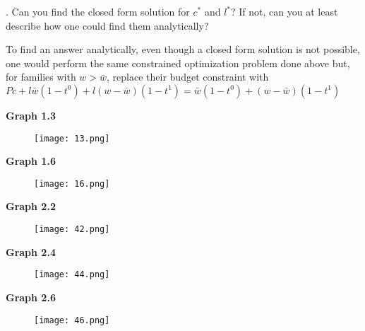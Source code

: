 \documentclass[11pt]{SelfArxOneColBMN}
\begin{document}
. Can you find the closed form solution for $c^*$ and $l^*$? If not, can you at least describe how one could find them analytically?
	\begin{solution}
		To find an answer analytically, even though a closed form solution is not possible, one would perform the same constrained optimization problem done above but, for families with $w > \bar{w}$, replace their budget constraint with\\
		$Pc + l\bar{w}(1 - t^0) + l(w - \bar{w})(1 - t^1) = \bar{w}(1 - t^0) + (w - \bar{w})(1 - t^1)$
	\end{solution}
\newpage
\clearpage
\noindent \textbf{Graph 1.3}
\begin{figure}[h]
        \texttt{[image: 13.png]}
\end{figure}
\clearpage
\noindent \textbf{Graph 1.6}
\begin{figure}[h]
        \texttt{[image: 16.png]}
\end{figure}
\newpage
\clearpage
\noindent \textbf{Graph 2.2}
\begin{figure}[h]
        \texttt{[image: 42.png]}
\end{figure}
\clearpage
\noindent \textbf{Graph 2.4}
\begin{figure}[h]
        \texttt{[image: 44.png]}
\end{figure}
\newpage
\clearpage
\noindent \textbf{Graph 2.6}
\begin{figure}[h]
        \texttt{[image: 46.png]}
\end{figure}
\end{document}
